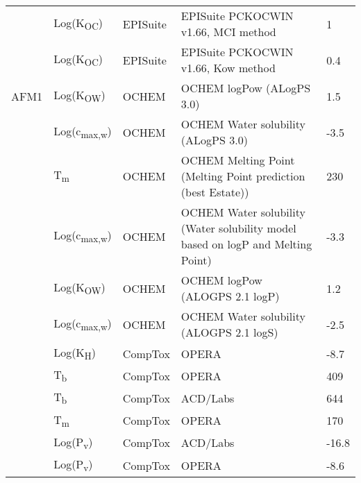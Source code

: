 \begin{landscape}
\begin{longtable}[c]{lllll}
          & Log(K\textsubscript{OC})      & EPISuite   & EPISuite PCKOCWIN v1.66, MCI method                                             & 1     \\
          & Log(K\textsubscript{OC})      & EPISuite   & EPISuite PCKOCWIN v1.66, Kow method                                             & 0.4   \\
          \hline
AFM1      & Log(K\textsubscript{OW})      & OCHEM      & OCHEM logPow (ALogPS 3.0)                                                       & 1.5   \\
          & Log(c\textsubscript{max,w}) & OCHEM      & OCHEM Water solubility (ALogPS 3.0)                                             & -3.5  \\
          & T\textsubscript{m}          & OCHEM      & OCHEM Melting Point (Melting Point prediction (best Estate))                    & 230   \\
          & Log(c\textsubscript{max,w}) & OCHEM      & OCHEM Water solubility (Water solubility model based on logP and Melting Point) & -3.3  \\
          & Log(K\textsubscript{OW})      & OCHEM      & OCHEM logPow (ALOGPS 2.1 logP)                                                  & 1.2   \\
          & Log(c\textsubscript{max,w}) & OCHEM      & OCHEM Water solubility (ALOGPS 2.1 logS)                                        & -2.5  \\
          & Log(K\textsubscript{H})       & CompTox    & OPERA                                                                           & -8.7  \\
          & T\textsubscript{b}          & CompTox    & OPERA                                                                           & 409   \\
          & T\textsubscript{b}          & CompTox    & ACD/Labs                                                                        & 644   \\
          & T\textsubscript{m}          & CompTox    & OPERA                                                                           & 170   \\
          & Log(P\textsubscript{v})       & CompTox    & ACD/Labs                                                                        & -16.8 \\
          & Log(P\textsubscript{v})       & CompTox    & OPERA                                                                           & -8.6  \\

\end{longtable}
\end{landscape}
